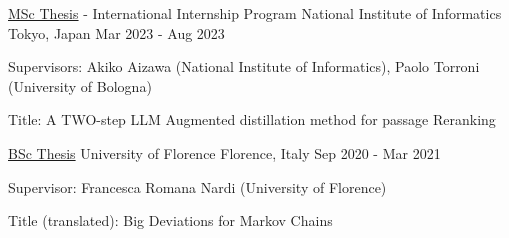 

\begin{cventries}

  \cventry
    {\href{https://amslaurea.unibo.it/30082/}{MSc Thesis} - International Internship Program} %
    {National Institute of Informatics} %
    {Tokyo, Japan} %
    {Mar 2023 - Aug 2023} %
    {
      \begin{cvitems} %
        \item {Supervisors: Akiko Aizawa (National Institute of Informatics), Paolo Torroni (University of Bologna)} 
        \item {Title: A TWO-step LLM Augmented distillation method for passage Reranking}
      \end{cvitems}
    }

  \cventry
    {\href{https://github.com/Freddavide/Freddavide/blob/main/elaborato_B036_Baldelli_Davide.pdf}{BSc Thesis}} %
    {University of Florence} %
    {Florence, Italy} %
    {Sep 2020 - Mar 2021} %
    {
      \begin{cvitems} %
        \item {Supervisor: Francesca Romana Nardi (University of Florence)}
        \item {Title (translated): Big Deviations for Markov Chains}
      \end{cvitems}
    }



\end{cventries}
